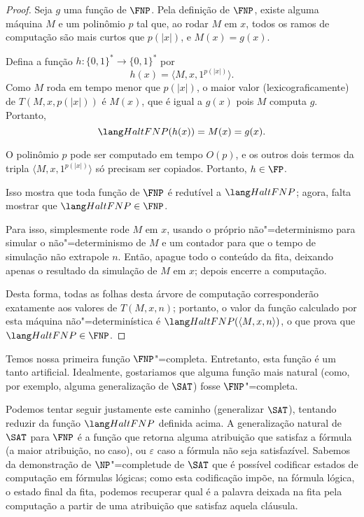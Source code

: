 \begin{proof}
    Seja $g$ uma função de $\FNP$.
    Pela definição de $\FNP$, existe alguma máquina $M$
    e um polinômio $p$ tal que,
    ao rodar $M$ em $x$,
    todos os ramos de computação são mais curtos que $p(|x|)$,
    e $M(x) = g(x)$.

    Defina a função $h: \{0, 1\}^* \to \{0, 1\}^*$
    por
    \begin{equation*}
        h(x) = \langle M, x, 1^{p(|x|)} \rangle.
    \end{equation*}
    Como $M$ roda em tempo menor que $p(|x|)$,
    o maior valor (lexicograficamente) de $T(M, x, p(|x|))$ é $M(x)$,
    que é igual a $g(x)$ pois $M$ computa $g$.
    Portanto,
    \begin{equation*}
        \HaltFNP(h(x)) = M(x) = g(x).
    \end{equation*}

    O polinômio $p$ pode ser computado em tempo $O(p)$,
    e os outros dois termos da tripla $\langle M, x, 1^{p(|x|)} \rangle$
    só precisam ser copiados. Portanto, $h \in \FP$.

    Isso mostra que toda função de $\FNP$ é redutível a $\HaltFNP$;
    agora, falta mostrar que $\HaltFNP \in \FNP$.

    Para isso, simplesmente rode $M$ em $x$,
    usando o próprio não"=determinismo para simular o não"=determinismo de $M$
    e um contador para que o tempo de simulação não extrapole $n$.
    Então, apague todo o conteúdo da fita,
    deixando apenas o resultado da simulação de $M$ em $x$;
    depois encerre a computação.

    Desta forma, todas as folhas desta árvore de computação
    corresponderão exatamente aos valores de $T(M, x, n)$;
    portanto, o valor da função calculado por esta máquina não"=determinística
    é $\HaltFNP(\langle M, x, n \rangle)$,
    o que prova que $\HaltFNP \in \FNP$.
\end{proof}

Temos nossa primeira função $\FNP$"=completa.
Entretanto, esta função é um tanto artificial.
Idealmente, gostariamos que alguma função mais natural
(como, por exemplo, alguma generalização de $\SAT$)
fosse $\FNP$"=completa.

Podemos tentar seguir justamente este caminho
(generalizar $\SAT$),
tentando reduzir da função $\HaltFNP$ definida acima.
A generalização natural de $\SAT$ para $\FNP$
é a função que retorna alguma atribuição que satisfaz a fórmula
(a maior atribuição, no caso),
ou $\varepsilon$ caso a fórmula não seja satisfazível.
Sabemos da demonstração de $\NP$"=completude de $\SAT$
que é possível codificar estados de computação em fórmulas lógicas;
como esta codificação impõe,
na fórmula lógica,
o estado final da fita,
podemos recuperar qual é a palavra deixada na fita pela computação
a partir de uma atribuição que satisfaz aquela cláusula.

